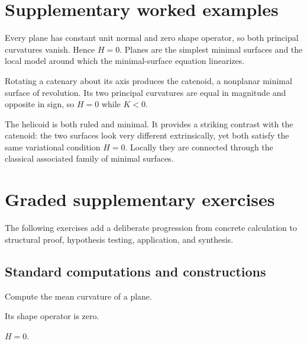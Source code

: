 \section{Supplementary worked examples}
\label{sec:vii19-pedagogy}

\begin{example}\label{ex:vii19-ped-01}
Every plane has constant unit normal and zero shape operator, so both principal curvatures vanish.  Hence \(H=0\).  Planes are the simplest minimal surfaces and the local model around which the minimal-surface equation linearizes.
\end{example}

\begin{example}\label{ex:vii19-ped-02}
Rotating a catenary about its axis produces the catenoid, a nonplanar minimal surface of revolution.  Its two principal curvatures are equal in magnitude and opposite in sign, so \(H=0\) while \(K<0\).
\end{example}

\begin{example}\label{ex:vii19-ped-03}
The helicoid is both ruled and minimal.  It provides a striking contrast with the catenoid: the two surfaces look very different extrinsically, yet both satisfy the same variational condition \(H=0\).  Locally they are connected through the classical associated family of minimal surfaces.
\end{example}

\section{Graded supplementary exercises}
The following exercises add a deliberate progression from concrete calculation to structural proof, hypothesis testing, application, and synthesis.

\subsection*{Standard computations and constructions}

\begin{exercise}\label{exr:vii19-ped-01}
Compute the mean curvature of a plane.
\end{exercise}
\begin{hint}
Its shape operator is zero.
\end{hint}
\begin{solution}
\(H=0\).
\end{solution}

